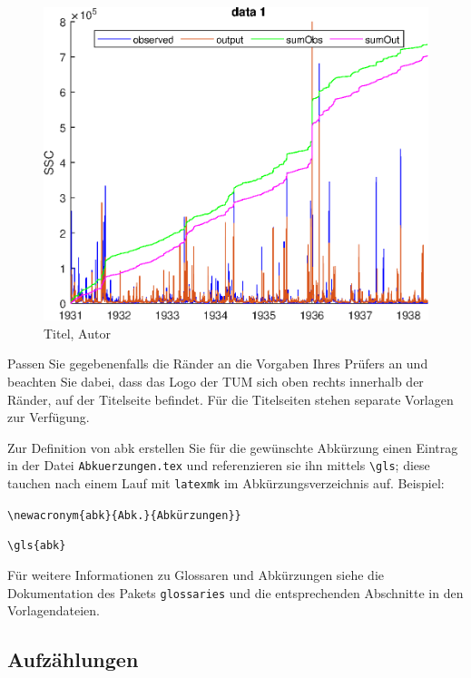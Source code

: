 \begin{figure}[!ht]
\noindent\hspace{0.5mm}\includegraphics[width=12cm]{./Ressourcen/epsFig}
\caption{Titel, Autor}
\end{figure}

\clearpage

Passen Sie gegebenenfalls die Ränder an die Vorgaben Ihres Prüfers an und
beachten Sie dabei, dass das Logo der TUM sich oben rechts innerhalb der
Ränder, auf der Titelseite befindet. Für die Titelseiten stehen separate
Vorlagen zur Verfügung.

Zur Definition von \gls{abk} erstellen Sie für die gewünschte Abkürzung einen
Eintrag in der Datei \texttt{Abkuerzungen.tex} und referenzieren sie ihn
mittels \texttt{\textbackslash{}gls}; diese tauchen nach einem Lauf mit
\texttt{latexmk} im Abkürzungsverzeichnis auf. Beispiel:

\vspace{-\baselineskip}
\begin{description}[leftmargin=1em+5mm, labelindent=5mm]
\item[Definition in \texttt{Abkuerzungen.tex}:] \texttt{\textbackslash{}newacronym\{abk\}\{Abk.\}\{Abkürzungen\}\}}
\item[Referenzierung:] \texttt{\textbackslash{}gls\{abk\}}
\end{description}

Für weitere Informationen zu Glossaren und Abkürzungen siehe die Dokumentation
des Pakets \texttt{glossaries} und die entsprechenden Abschnitte in den
Vorlagendateien.


\subsection[]{Aufzählungen}

